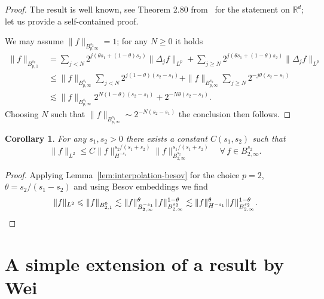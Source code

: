 \documentclass[11pt,oneside,reqno]{amsart}
\newtheorem{corollary}[theorem]{Corollary}
\numberwithin{equation}{section}
\begin{document}
\begin{proof}
  The result is well known, see Theorem 2.80 from~{\cite{bahouri}} for the
  statement on $\mathbb{R}^d$; let us provide a self-contained proof.
  
  We may assume $\| f \|_{B^{s_2}_{p, \infty}} = 1$; for any $N \geqslant 0$
  it holds
%  
  \begin{align*}
    \| f \|_{B^{s_{\theta}}_{p, 1}} & = \sum_{j < N} 2^{j (\theta s_1 + (1 -
    \theta) s_2)} \| \Delta_j f \|_{L^p} + \sum_{j \geqslant N} 2^{j (\theta
    s_1 + (1 - \theta) s_2)} \| \Delta_j f \|_{L^p}\\
    & \leqslant \| f \|_{B^{s_1}_{p, \infty}} \sum_{j < N} 2^{j (1 - \theta)
    (s_2 - s_1)} + \| f \|_{B^{s_2}_{p, \infty}} \sum_{j \geqslant N} 2^{- j
    \theta (s_2 - s_1)}\\
    & \lesssim \| f \|_{B^{s_1}_{p, \infty}} 2^{N (1 - \theta) (s_2 - s_1)} +
    2^{- N \theta (s_2 - s_1)} .
  \end{align*}
%  
  Choosing $N$ such that $\| f \|_{B^{s_1}_{p, \infty}} \sim 2^{- N (s_2 -
  s_1)}$ the conclusion then follows.
\end{proof}

\begin{corollary}
  \label{cor:interpolation-besov}For any $s_1, s_2 > 0$ there exists a
  constant $C (s_1, s_2)$ such that
  \begin{equation}
    \| f \|_{L^2} \leqslant C \| f \|_{H^{- s_1}}^{s_2 / (s_1 + s_2)}  \| f
    \|_{B^{s_2}_{2, \infty}}^{s_1 / (s_1 + s_2)} \quad \forall \, f \in
    B^{s_2}_{2, \infty} . \label{eq:interpolation-besov-2}
  \end{equation}
\end{corollary}

\begin{proof}
  Applying Lemma~\ref{lem:interpolation-besov} for the choice $p = 2$, $\theta
  = s_2 / (s_1 - s_2)$ and using Besov embeddings we find
  \[ \| f \|_{L^2} \leqslant \| f \|_{B^0_{2, 1}} \lesssim \| f \|_{B^{-
     s_1}_{2, \infty}}^{\theta}  \| f \|^{1 - \theta}_{B^{s_2}_{2, \infty}}
     \lesssim \| f \|_{H^{- s_1}}^{\theta} \| f \|^{1 - \theta}_{B^{s_2}_{2,
     \infty}} . \qedhere \]
\end{proof}

\section{A simple extension of a result by Wei}\label{app:wei-extension}
\end{document}
